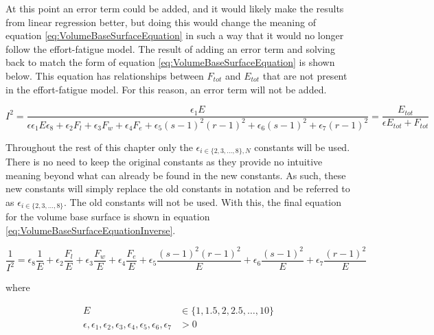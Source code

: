 At this point an error term could be added, and it would likely make the results from linear regression better, but doing this would change the meaning of equation \ref{eq:VolumeBaseSurfaceEquation} in such a way that it would no longer follow the effort-fatigue model. The result of adding an error term and solving back to match the form of equation \ref{eq:VolumeBaseSurfaceEquation} is shown below. This equation has relationships between $F_{tot}$ and $E_{tot}$ that are not present in the effort-fatigue model. For this reason, an error term will not be added.

\begin{equation*}
	I^2=\frac{
		\epsilon_1E
	}{
		\epsilon\epsilon_1E
		\epsilon_8+
		\epsilon_2 F_l+
		\epsilon_3 F_w+
		\epsilon_4 F_e+
		\epsilon_5 (s-1)^2(r-1)^2+
		\epsilon_6 (s-1)^2+
		\epsilon_7 (r-1)^2
	}=\frac{E_{tot}}{\epsilon E_{tot}+F_{tot}}
\end{equation*}

Throughout the rest of this chapter only the $\epsilon_{i\in\{2,3,...,8\},N}$ constants will be used. There is no need to keep the original constants as they provide no intuitive meaning beyond what can already be found in the new constants. As such, these new constants will simply replace the old constants in notation and be referred to as $\epsilon_{i\in\{2,3,...,8\}}$. The old constants will not be used. With this, the final equation for the volume base surface is shown in equation \ref{eq:VolumeBaseSurfaceEquationInverse}.

\begin{minipage}{\textwidth}
	\begin{equation}
		\frac{1}{I^2}=
			\epsilon_{8}\frac{1}{E}+
			\epsilon_{2}\frac{F_l}{E}+
			\epsilon_{3}\frac{F_w}{E}+
			\epsilon_{4}\frac{F_e}{E}+
			\epsilon_{5}\frac{(s-1)^2(r-1)^2}{E}+
			\epsilon_{6}\frac{(s-1)^2}{E}+
			\epsilon_{7}\frac{(r-1)^2}{E}
		\label{eq:VolumeBaseSurfaceEquationInverse}
	\end{equation}
	\centerline{where}
	\begin{equation*}
		\begin{split}
	        E & \in \{ 1,1.5,2,2.5, \dots ,10 \} \\
	        \epsilon, \epsilon_1, \epsilon_2, \epsilon_3, \epsilon_4, \epsilon_5,\epsilon_6,\epsilon_7 & > 0 \\
	    \end{split}
	\end{equation*}
\end{minipage}

